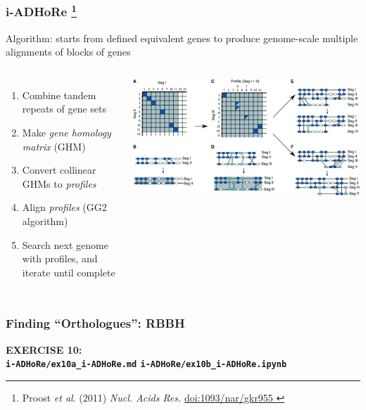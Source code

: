 %
\begin{frame}
  \frametitle{i-ADHoRe
    \footnote{\tiny{Proost \textit{et al}. (2011) \textit{Nucl. Acids Res.} \href{http://dx.doi.org/10..1093/nar/gkr955}{doi:1093/nar/gkr955
  }}}
}
  Algorithm: starts from defined equivalent genes to produce genome-scale multiple alignments of blocks of genes
  {\small
  \begin{columns}[T] 
      \begin{enumerate}
        \item Combine tandem repeats of gene sets
        \item Make \textcolor{hutton_green}{\textit{gene homology matrix} (GHM)}
        \item Convert collinear GHMs to \textcolor{hutton_blue}{\textit{profiles}}
        \item Align \textit{profiles} (GG2 algorithm)
        \item Search next genome with profiles, and \textcolor{hutton_purple}{iterate until complete}
      \end{enumerate}  
        \includegraphics[width=\textwidth]{images/i-adhore_algorithm}
    \end{columns}
    }    
\end{frame}

%
\begin{frame}
  \frametitle{Finding ``Orthologues'': RBBH}
  \Large{
    \textcolor{hutton_blue}{
      \textbf{
      EXERCISE 10: \\
      \texttt{i-ADHoRe/ex10a\_i-ADHoRe.md}      
      \texttt{i-ADHoRe/ex10b\_i-ADHoRe.ipynb}
      }
    }
  }
\end{frame}
